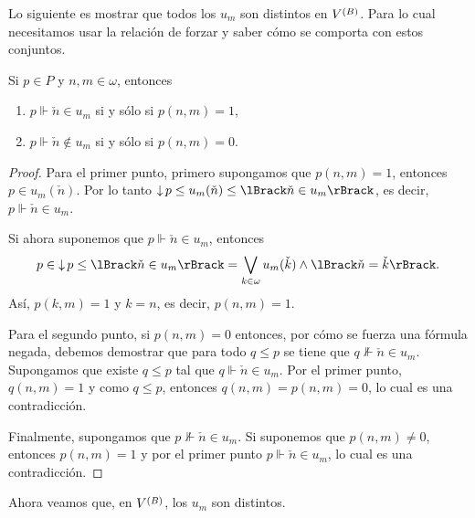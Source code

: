 \documentclass[letterpaper,DIV=15,12pt]{scrartcl}
\DeclarePairedDelimiter{\vb}{\lBrack}{\rBrack}             %
\DeclareMathOperator{\abajo}{\downarrow}                   %
\begin{document}
Lo siguiente es mostrar que todos los \(u_m\) son distintos en \(\mb\). Para lo
cual necesitamos usar la relación de forzar y saber cómo se comporta con estos
conjuntos.

\begin{lemma}
    Si \(p\in P\) y \(n,m\in\omega\), entonces
    \begin{enumerate}
        \item \(p\Vdash\check{n}\in u_m\) si y sólo si \(p(n,m)=1\),
        \item \(p\Vdash\check{n}\notin u_m\) si y sólo si \(p(n,m)=0\).
    \end{enumerate}
\end{lemma}
\begin{proof}
    Para el primer punto, primero supongamos que \(p(n,m)=1\), entonces 
    \(p\in u_m(\check{n})\). Por lo tanto 
    \(\abajo p\leq u_m(\check{n})\leq\vb{\check{n}\in u_m}\), es decir, 
    \(p\Vdash\check{n}\in u_m\).

    Si ahora suponemos que \(p\Vdash\check{n}\in u_m\), entonces
    \begin{equation*}
        p\in\abajo p\leq\vb{\check{n}\in u_m}
        =\bigvee_{k\in\omega} u_m(\check{k})\land\vb{\check{n}=\check{k}}.
    \end{equation*}
    Así, \(p(k,m)=1\) y \(k=n\), es decir, \(p(n,m)=1\).

    Para el segundo punto, si \(p(n,m)=0\) entonces, por cómo se fuerza una
    fórmula negada, debemos demostrar que para todo \(q\leq p\) se tiene que
    \(q\not\Vdash\check{n}\in u_m\). Supongamos que existe \(q\leq p\) tal que
    \(q\Vdash\check{n}\in u_m\). Por el primer punto, \(q(n,m)=1\) y como
    \(q\leq p\), entonces \(q(n,m)=p(n,m)=0\), lo cual es una contradicción. 

    Finalmente, supongamos que \(p\not\Vdash\check{n}\in u_m\). Si suponemos que
    \(p(n,m)\ne0\), entonces \(p(n,m)=1\) y por el primer punto
    \(p\Vdash\check{n}\in u_m\), lo cual es una contradicción.
\end{proof}

Ahora veamos que, en \(\mb\), los \(u_m\) son distintos.
\end{document}
